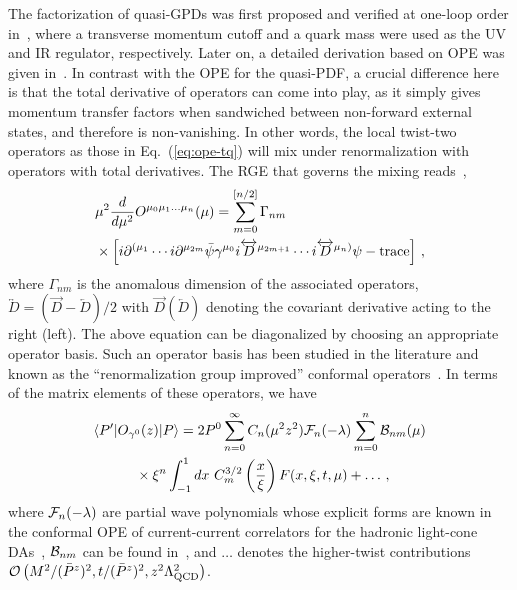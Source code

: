 \documentclass[aps,rmp,reprint,amsmath,amssymb,graphicx,longbibliography]{revtex4-1} %
\newcommand{\nn}{\nonumber}
\begin{document}
The factorization of quasi-GPDs was first proposed and verified at one-loop order in~\cite{Ji:2015qla,Xiong:2015nua}, where a transverse momentum cutoff and a quark mass were used as the UV and IR regulator, respectively. Later on, a detailed derivation based on OPE was given in~\cite{Liu:2019urm}. In contrast with the OPE for the quasi-PDF, a crucial difference here is that the total derivative of operators can come into play, as it simply gives momentum transfer factors when sandwiched between non-forward external states, and therefore is non-vanishing. In other words, the local twist-two operators as those in Eq.~(\ref{eq:ope-tq}) will mix under renormalization with operators with total derivatives.
%
The RGE that governs the mixing reads~\cite{Braun:2003rp},
\begin{align} \label{eq:rge}
	&\mu^2 {d\over d\mu^2}O^{{\mu}_0 {\mu}_1 \ldots {\mu}_n}(\mu) = \sum_{m=0}^{[n/2]}\Gamma_{nm}\\
	&\times\left[i\partial^{(\mu_1}\cdots i\partial^{\mu_{2m}} \bar{\psi} \gamma^{\mu_0}i\overleftrightarrow{D}^{\mu_{2m+1}}\cdots i\overleftrightarrow{D}^{\mu_n)}\psi-{\rm trace}\right]\,,\nn
\end{align}
where $\Gamma_{nm}$ is the anomalous dimension of the associated operators, $\overleftrightarrow{D}=(\overrightarrow{D}-\overleftarrow{D})/2$ with $\overrightarrow{D} (\overleftarrow{D})$ denoting the covariant derivative acting to the right (left). The above equation can be diagonalized by choosing an appropriate operator basis. Such an operator basis has been studied in the literature and known as the ``renormalization group improved'' conformal operators~\cite{Braun:2003rp,Mueller:1993hg}. In terms of the matrix elements of these operators, we have
\begin{align}\label{eq:ope-twist2}
	&\langle P'|{O}_{\gamma^0}(z)|P\rangle  =  2P^0\sum_{n=0}^\infty C_n ({\mu}^2 z^2){\cal F}_n(-\lambda)\sum_{m=0}^n{\cal B}_{nm}(\mu)\nn\\
	&\hspace{3em}\times\xi^n\int_{-1}^1 dx\ C_m^{3/2}\left({x\over \xi}\right) F(x,\xi,t,\mu)+\ldots\,,
\end{align}
where ${\cal F}_n(-\lambda)$
are partial wave polynomials whose explicit forms are known in the conformal OPE of current-current correlators for the hadronic light-cone DAs~\cite{Braun:2007wv}, ${\cal B}_{nm}$ can be found in~\cite{Braun:2003rp,Mueller:1993hg}, and $\ldots$ denotes the higher-twist contributions $\mathcal{O}\left({M^2/ ({\bar P}^z)^2},{t/ ({\bar P}^z)^2},z^2\Lambda_{\rm QCD}^2\right)$.
\end{document}
